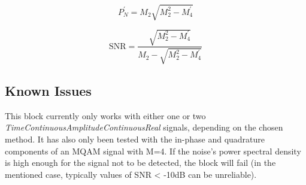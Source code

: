 \begin{refsection}
\begin{equation}
	P^\prime_N = M_2 \sqrt{M^2_2 - M^\prime_4}
\end{equation}

\begin{equation}
	\text{SNR} = \frac{\sqrt{M_2^2 - M^\prime_4}}{M_2 - \sqrt{M_2^2 - M^\prime_4}}
\end{equation}




\subsection*{Known Issues}\label{snrestissues}

This block currently only works with either one or two
\textit{TimeContinuousAmplitudeContinuousReal} signals, depending on the chosen
method. It has also only been tested with the in-phase and quadrature components of an MQAM signal with M=4.
If the noise's power spectral density is high enough for the signal not to be
detected, the block will fail (in the mentioned case, typically
values of SNR < -10dB can be unreliable).





\clearpage
\printbibliography[heading=subbibliography]
\end{refsection}
\cleardoublepage
